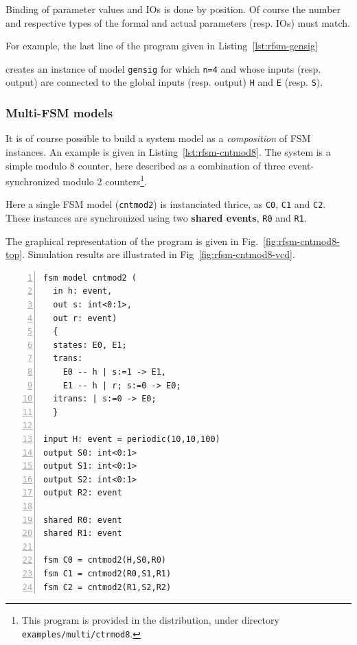 Binding of parameter values and IOs is done by position. Of course the number and respective types
of the formal and actual parameters (resp. IOs) must match.

\medskip
For example, the last line of the program given in Listing~\ref{lst:rfsm-gensig}

\begin{center}
\end{center}

creates an instance of model \verb|gensig| for which \verb|n=4| and whose inputs (resp. output) are
connected to the global inputs (resp. output) \texttt{H} and \texttt{E} (resp. \texttt{S}).

\subsubsection*{Multi-FSM models}
\label{sec:multi-fsm-models}

It is of course possible to build a system model as a \emph{composition} of FSM instances.  An
example is given in Listing~\ref{lst:rfsm-cntmod8}. The system is a simple modulo 8 counter, here
described as a combination of three event-synchronized modulo 2 counters\footnote{This program is
  provided in the distribution, under directory \texttt{examples/multi/ctrmod8}.}.

\medskip
Here a single FSM model (\texttt{cntmod2}) is instanciated thrice, as \texttt{C0}, \texttt{C1} and
\texttt{C2}. These instances are synchronized using two \textbf{shared events}, \texttt{R0} and \texttt{R1}. 

\medskip
The graphical representation of the program is given in Fig.~\ref{fig:rfsm-cntmod8-top}. Simulation
results are illustrated in Fig~\ref{fig:rfsm-cntmod8-vcd}. 

\begin{lstlisting}[language=Rfsm,frame=single,numbers=left,caption=A multi-model RFSM
  program,label={lst:rfsm-cntmod8},float]
fsm model cntmod2 (
  in h: event,
  out s: int<0:1>,
  out r: event)
  {
  states: E0, E1;
  trans:
    E0 -- h | s:=1 -> E1,
    E1 -- h | r; s:=0 -> E0;
  itrans: | s:=0 -> E0;
  }

input H: event = periodic(10,10,100)
output S0: int<0:1>
output S1: int<0:1>
output S2: int<0:1>
output R2: event

shared R0: event
shared R1: event

fsm C0 = cntmod2(H,S0,R0) 
fsm C1 = cntmod2(R0,S1,R1) 
fsm C2 = cntmod2(R1,S2,R2) 
\end{lstlisting}

